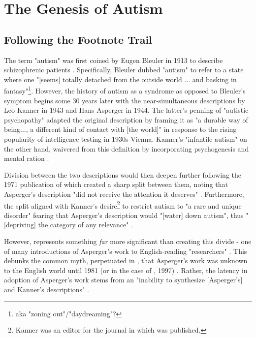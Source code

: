 \documentclass[letterpaper]{article}
\begin{document}
\section{The Genesis of Autism}
\subsection{Following the Footnote Trail}
The term "autism" was first coined by Eugen Bleuler in 1913 to describe schizophrenic patients \cite[p.~213]{eyal}. Specifically, Bleuler dubbed "autism" to refer to a state where one "[seems] totally detached from the outside world ... and basking in fantasy"\cite[p.~213]{eyal}\footnote{aka "zoning out"/"daydreaming"?}. However, the history of autism as a syndrome as opposed to Bleuler's symptom begins some 30 years later with the near-simultaneous descriptions by Leo Kanner in 1943 and Hans Asperger in 1944. The latter's penning of "autistic psychopathy" adapted the original description by framing it as "a durable way of being..., a different kind of contact with [the world]"\cite[p.~213]{eyal} in response to the rising popularity of intelligence testing in 1930s Vienna. Kanner's "infantile autism" on the other hand, waivered from this definition by incorporating psychogenesis and mental ration \cite[p.~215]{eyal}.

Division between the two descriptions would then deepen further following the 1971 publication of \cite{vk} which created a sharp split between them, noting that Asperger's description "did not receive the attention it deserves" \cite{vk}. Furthermore, the split aligned with Kanner's desire\footnote{Kanner was an editor for the journal in which \cite{vk} was published.} to restrict autism to "a rare and unique disorder" fearing that Asperger's description would "[water] down autism", thus "[depriving] the category of any relevance" \cite[p.~216]{eyal}.


However, \cite{vk} represents something \textit{far} more significant than creating this divide - one of many introductions of Asperger's work to English-reading "researchers" \cite[pp.~216-7]{eyal}. This debunks the common myth, perpetuated in \cite{diff}, that Asperger's work was unknown to the English world until 1981 (or in the case of \cite{diff}, 1997) \cite[p.~216]{eyal}. Rather, the latency in adoption of Asperger's work stems from an "inability to synthesize [Asperger's] and Kanner's descriptions" \cite[p.~222]{eyal}. 
\end{document}
